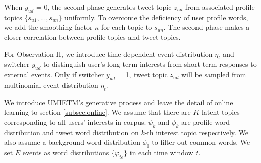 \documentclass{llncs}
\begin{document}
When \(y_{ud}\) = 0, the second phase generates tweet topic \(z_{ud}\) from associated profile topics \(\{s_{u1},..., s_{un}\}\) uniformly. 
To overcome the deficiency of user profile words, we add the smoothing factor \(\kappa\) for each topic to \(s_{un}\). 
The second phase makes a closer correlation between profile topics and tweet topics. 

For Observation II, we introduce time dependent event distribution \(\eta_t\) and switcher \(y_{ud}\) to distinguish user’s long term interests from short term responses to external events. 
Only if switcher \(y_{ud}\) = 1, tweet topic \(z_{ud}\) will be sampled from multinomial event distribution \(\eta_{t}\).

We introduce UMIETM's generative process and leave the detail of online learning to section \ref{subsec:online}.
We assume that there are \(K\) latent topics corresponding to all users' interests in corpus.
\(\psi_k\) and \(\phi_k\) are profile word distribution and tweet word distribution on \(k\)-th interest topic respectively.
We also assume a background word distribution \(\phi_0\) to filter out common words.
We set \(E\) events as word distributions \(\{\varphi_{te}\}\) in each time window \(t\).
\end{document}
